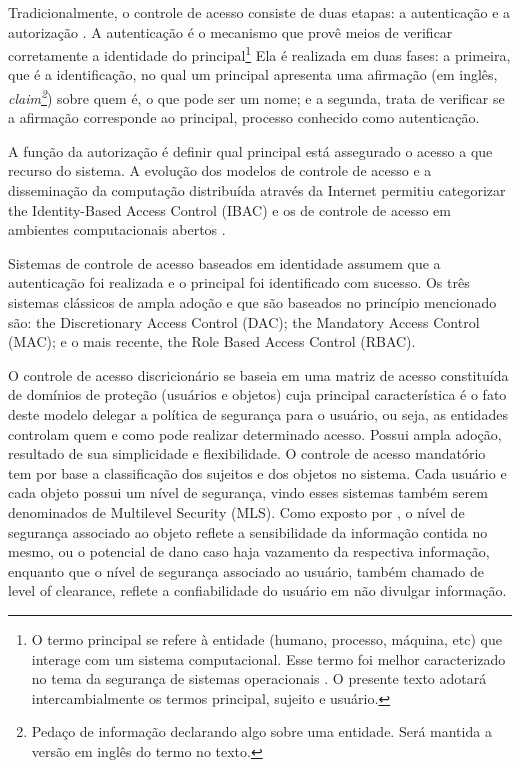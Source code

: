 \documentclass{doublecol-new}
\begin{document}
Tradicionalmente, o controle de acesso consiste de duas etapas: a autenticação e a autorização \cite{gollmann2011compsecurity}. A autenticação é o mecanismo que provê meios de verificar corretamente a identidade do principal\footnote{O termo principal se refere à entidade (humano, processo, máquina, etc) que interage com um sistema computacional. Esse termo foi melhor caracterizado no tema da segurança de sistemas operacionais \cite{gollmann2011compsecurity}. O presente texto adotará intercambialmente os termos principal, sujeito e usuário.} Ela é realizada em duas fases: a primeira, que é a identificação, no qual um principal apresenta uma afirmação (em inglês, \textit{claim\footnote{Pedaço de informação declarando algo sobre uma entidade. Será mantida a versão em inglês do termo no texto.}}) sobre quem é, o que pode ser um nome; e a segunda, trata de verificar se a afirmação corresponde ao principal, processo conhecido como autenticação. 

A função da autorização é definir qual principal está assegurado o acesso a que recurso do sistema. A evolução dos modelos de controle de acesso e a disseminação da computação distribuída através da Internet permitiu categorizar the Identity-Based Access Control (IBAC) e os de controle de acesso em ambientes computacionais abertos \cite{gollmann2011compsecurity}.

Sistemas de controle de acesso baseados em identidade assumem que a autenticação foi realizada e o principal foi identificado com sucesso. Os três sistemas clássicos de ampla adoção e que são baseados no princípio mencionado são: the Discretionary Access Control (DAC); the Mandatory Access Control (MAC); e o mais recente, the Role Based Access Control (RBAC).

O controle de acesso discricionário \cite{lampson1974protection} se baseia em uma matriz de acesso constituída de domínios de proteção (usuários e objetos) cuja principal característica é o fato deste modelo delegar a política de segurança para o usuário, ou seja, as entidades controlam quem e como pode realizar determinado acesso. Possui ampla adoção, resultado de sua simplicidade e flexibilidade. O controle de acesso mandatório tem por base a classificação dos sujeitos e dos objetos no sistema. Cada usuário e cada objeto possui um nível de segurança, vindo esses sistemas também serem denominados de Multilevel Security (MLS). Como exposto por \cite{sandhu1994access}, o nível de segurança associado ao objeto reflete a sensibilidade da informação contida no mesmo, ou o potencial de dano caso haja vazamento da respectiva informação, enquanto que o nível de segurança associado ao usuário, também chamado de level of clearance, reflete a confiabilidade do usuário em não divulgar informação. 
\end{document}
